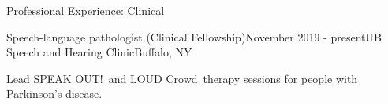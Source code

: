 \documentclass{resume} %
\begin{document}

\begin{rSection}{Professional Experience: Clinical}

	\begin{rSubsection}{Speech-language pathologist (Clinical Fellowship)}{November 2019 - present}{UB Speech and Hearing Clinic}{Buffalo, NY}
	\item Lead SPEAK OUT!\textregistered \ and LOUD Crowd\textregistered \ therapy sessions for people with Parkinson's disease.
	\end{rSubsection}
%
%
%
%	
%	
%	

\end{rSection}
\end{document}
